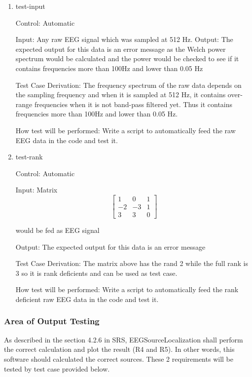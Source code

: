 \documentclass[12pt, titlepage]{article}
\renewcommand{\progname}{EEGSourceLocalization}
\begin{document}
\begin{enumerate}

\item{test-input\\}

Control: Automatic
					
Input: Any raw EEG signal which was sampled at 512 Hz.					
Output: The expected output for this data is an error message as the Welch power spectrum would be calculated and the power would be checked to see if it contains frequencies more than 100Hz and lower than 0.05 Hz

Test Case Derivation:  The frequency spectrum of the raw data depends on the sampling frequency and when it is sampled at 512 Hz, it contains over-range frequencies when it is not band-pass filtered yet. Thus it contains frequencies more than 100Hz and lower than 0.05 Hz.

					
How test will be performed: Write a script to automatically feed the raw EEG data in the code and test it.
					
\item{test-rank\\}

Control: Automatic
					
Input: Matrix 
\[
\begin{bmatrix}
1 & 0 & 1\\
-2 & -3 & 1\\
3 & 3 & 0
\end{bmatrix} 
\]

would be fed as EEG signal
					
Output: The expected output for this data is an error message 

Test Case Derivation: The matrix above has the rand 2 while the full rank is 3 so it is rank deficients and can be used as test case.

How test will be performed: Write a script to automatically feed the rank deficient raw EEG data in the code and test it.

\end{enumerate}



\subsubsection{Area of Output Testing}

As described in the section 4.2.6 in SRS, \progname{}  shall perform the correct calculation and plot the result (R4 and R5). In other words, this software should calculated the correct sources. These 2 requirements will be tested by test case provided below.\\
\end{document}

